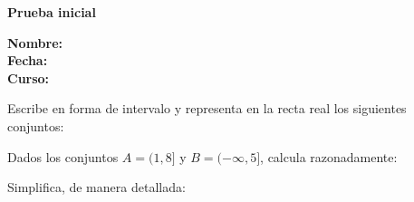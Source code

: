 \documentclass{exam}
\begin{document}
\begin{center}
\bfseries Prueba inicial
\end{center}
\textbf{Nombre:} \\
\textbf{Fecha:} \\
\textbf{Curso:} \\
\hline

\begin{questions}
\question Escribe en forma de intervalo y representa en la recta real los siguientes conjuntos:

\question Dados los conjuntos $A=(1,8]$ y $B=(-\infty,5]$, calcula razonadamente:

\question Simplifica, de manera detallada:
\end{questions}
\end{document}
